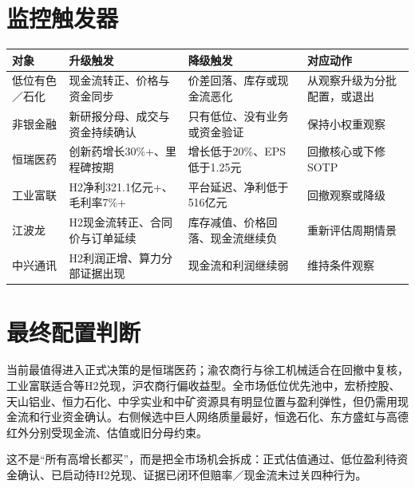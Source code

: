 \section{监控触发器}

\begin{exhibitbox}
\begin{tabularx}{\textwidth}{L{2.1cm}L{3.5cm}L{3.4cm}X}
\toprule
\textbf{对象} & \textbf{升级触发} & \textbf{降级触发} & \textbf{对应动作} \\
\midrule
低位有色／石化 & 现金流转正、价格与资金同步 & 价差回落、库存或现金流恶化 & 从观察升级为分批配置，或退出 \\
非银金融 & 新研报分母、成交与资金持续确认 & 只有低位、没有业务或资金验证 & 保持小权重观察 \\
恒瑞医药 & 创新药增长30\%+、里程碑按期 & 增长低于20\%、EPS低于1.25元 & 回撤核心或下修SOTP \\
工业富联 & H2净利321.1亿元+、毛利率7\%+ & 平台延迟、净利低于516亿元 & 回撤观察或降级 \\
江波龙 & H2现金流转正、合同价与订单延续 & 库存减值、价格回落、现金流继续负 & 重新评估周期情景 \\
中兴通讯 & H2利润正增、算力分部证据出现 & 现金流和利润继续弱 & 维持条件观察 \\
\bottomrule
\end{tabularx}
\end{exhibitbox}

\section{最终配置判断}

当前最值得进入正式决策的是恒瑞医药；渝农商行与徐工机械适合在回撤中复核，工业富联适合等H2兑现，沪农商行偏收益型。全市场低位优先池中，宏桥控股、天山铝业、恒力石化、中孚实业和中矿资源具有明显位置与盈利弹性，但仍需用现金流和行业资金确认。右侧候选中巨人网络质量最好，恒逸石化、东方盛虹与高德红外分别受现金流、估值或旧分母约束。

这不是“所有高增长都买”，而是把全市场机会拆成：正式估值通过、低位盈利待资金确认、已启动待H2兑现、证据已闭环但赔率／现金流未过关四种行为。
